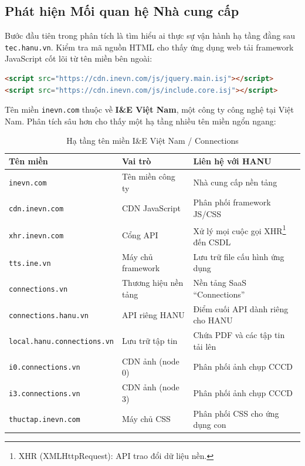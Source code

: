 \documentclass[12pt,a4paper]{article}
\begin{document}
\subsection{Phát hiện Mối quan hệ Nhà cung cấp}

Bước đầu tiên trong phân tích là tìm hiểu ai thực sự vận hành hạ tầng đằng sau \texttt{tec.hanu.vn}. Kiểm tra mã nguồn HTML cho thấy ứng dụng web tải framework JavaScript cốt lõi từ tên miền bên ngoài:

\begin{lstlisting}[language=HTML,title={Tải Framework từ bên ngoài (từ mã nguồn trang)}]
<script src="https://cdn.inevn.com/js/jquery.main.isj"></script>
<script src="https://cdn.inevn.com/js/include.core.isj"></script>
\end{lstlisting}

\noindent Tên miền \texttt{inevn.com} thuộc về \textbf{I\&E Việt Nam}, một công ty công nghệ tại Việt Nam. Phân tích sâu hơn cho thấy một hạ tầng nhiều tên miền ngổn ngang:

\begin{table}[H]
\centering
\caption{Hạ tầng tên miền I\&E Việt Nam / Connections}
\begin{tabular}{@{}lll@{}}
\toprule
\textbf{Tên miền} & \textbf{Vai trò} & \textbf{Liên hệ với HANU} \\
\midrule
\texttt{inevn.com} & Tên miền công ty & Nhà cung cấp nền tảng \\
\texttt{cdn.inevn.com} & CDN JavaScript & Phân phối framework JS/CSS \\
\texttt{xhr.inevn.com} & Cổng API & Xử lý mọi cuộc gọi XHR\footnote{XHR (XMLHttpRequest): API trao đổi dữ liệu nền.} đến CSDL \\
\texttt{tts.ine.vn} & Máy chủ framework & Lưu trữ file cấu hình ứng dụng \\
\texttt{connections.vn} & Thương hiệu nền tảng & Nền tảng SaaS ``Connections'' \\
\texttt{connections.hanu.vn} & API riêng HANU & Điểm cuối API dành riêng cho HANU \\
\texttt{local.hanu.connections.vn} & Lưu trữ tập tin & Chứa PDF và các tập tin tải lên \\
\texttt{i0.connections.vn} & CDN ảnh (node 0) & Phân phối ảnh chụp CCCD \\
\texttt{i3.connections.vn} & CDN ảnh (node 3) & Phân phối ảnh chụp CCCD \\
\texttt{thuctap.inevn.com} & Máy chủ CSS & Phân phối CSS cho ứng dụng con \\
\bottomrule
\end{tabular}
\end{table}
\end{document}
